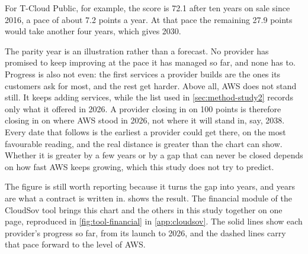 For T-Cloud Public, for example, the score is 72.1 after ten years on sale since
2016, a pace of about 7.2 points a year. At that pace the remaining 27.9 points
would take another four years, which gives 2030.

The parity year is an illustration rather than a forecast. No provider has promised
to keep improving at the pace it has managed so far, and none has to. Progress is
also not even: the first services a provider builds are the ones its customers ask
for most, and the rest get harder. Above all, \acs{AWS} does not stand still. It
keeps adding services, while the list used in \cref{sec:method-study2} records only
what it offered in 2026. A provider closing in on 100 points is therefore closing in
on where \acs{AWS} stood in 2026, not where it will stand in, say, 2038. Every date
that follows is the earliest a provider could get there, on the most favourable
reading, and the real distance is greater than the chart can show. Whether it is
greater by a few years or by a gap that can never be closed depends on how fast
\acs{AWS} keeps growing, which this study does not try to predict.

The figure is still worth reporting because it turns the gap into years, and years
are what a contract is written in.  shows the result.
The financial module of the CloudSov tool brings this chart and the others in this
study together on one page, reproduced in \cref{fig:tool-financial} in
\cref{app:cloudsov}.
The solid lines show each provider's progress so far, from its launch to 2026, and
the dashed lines carry that pace forward to the level of \acs{AWS}.

